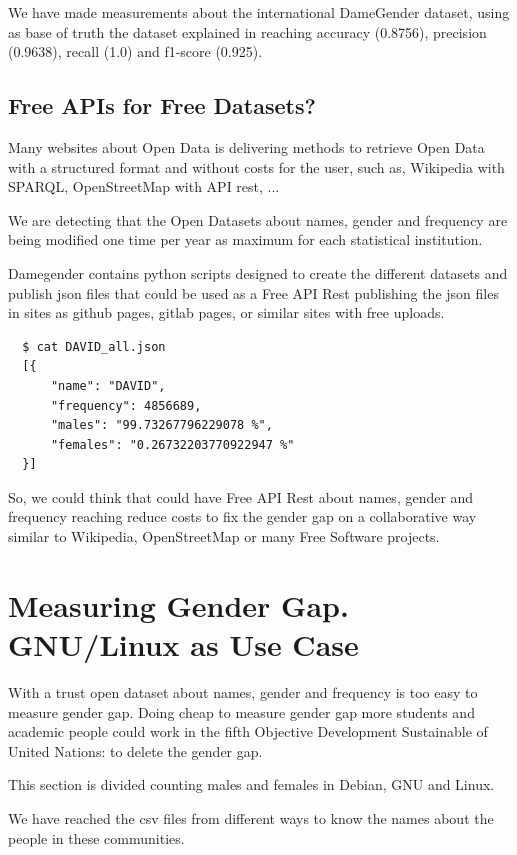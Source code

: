 \documentclass[a4paper]{article}
\begin{document}
We have made measurements about the international DameGender dataset,
using as base of truth the dataset explained in
\cite{10.7717/peerj-cs.156} reaching accuracy (0.8756), precision
(0.9638), recall (1.0) and f1-score (0.925).

\subsection{Free APIs for Free Datasets?}
\label{sec:freeapis}

Many websites about Open Data is delivering methods to retrieve Open
Data with a structured format and without costs for the user, such as,
Wikipedia with SPARQL, OpenStreetMap with API rest, ...

We are detecting that the Open Datasets about names, gender and
frequency are being modified one time per year as maximum for each
statistical institution.

Damegender contains python scripts designed to create the
different datasets and publish json files that could be used as a Free
API Rest publishing the json files in sites as github pages, gitlab
pages, or similar sites with free uploads.

\begin{verbatim}
  $ cat DAVID_all.json
  [{
      "name": "DAVID",
      "frequency": 4856689,
      "males": "99.73267796229078 %",
      "females": "0.26732203770922947 %"
  }]
\end{verbatim}

So, we could think that could have Free API Rest about names, gender
and frequency reaching reduce costs to fix the gender gap on a
collaborative way similar to Wikipedia, OpenStreetMap or many Free
Software projects.

\section{Measuring Gender Gap. GNU/Linux as Use Case}
\label{sec:measuring}

With a trust open dataset about names, gender and frequency is too
easy to measure gender gap. Doing cheap to measure gender gap more
students and academic people could work in the fifth Objective
Development Sustainable of United Nations: to delete the gender gap.

This section is divided counting males and females in Debian, GNU and
Linux.

We have reached the csv files from different ways to know the names
about the people in these communities.
\end{document}
